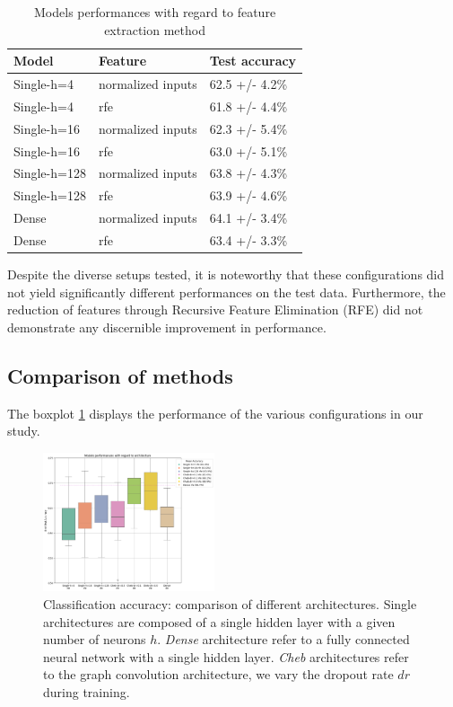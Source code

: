\begin{table}
	\begin{center}
		\begin{tabular}{lll}
			Model & Feature & Test accuracy \\
			\hline
			Single-h=4 & normalized inputs & 62.5 +/- 4.2\% \\
			Single-h=4 & rfe & 61.8 +/- 4.4\% \\
			Single-h=16 & normalized inputs & 62.3 +/- 5.4\% \\
			Single-h=16 & rfe & 63.0 +/- 5.1\% \\
			Single-h=128 & normalized inputs & 63.8 +/- 4.3\% \\
			Single-h=128 & rfe & 63.9 +/- 4.6\% \\
			Dense & normalized inputs & 64.1 +/- 3.4\% \\
			Dense & rfe & 63.4 +/- 3.3\% \\
		\end{tabular}
	\end{center}
	\caption{Models performances with regard to feature extraction method}
	\label{table:dependance_on_feature_extraction_method}
\end{table}

Despite the diverse setups tested, it is noteworthy that these configurations did not yield significantly different performances on the test data. Furthermore, the reduction of features through Recursive Feature Elimination (RFE) did not demonstrate any discernible improvement in performance.

\subsection{Comparison of methods}

The boxplot \ref{fig:results_architecture} displays the performance of the various configurations in our study. 
\begin{figure}[h!]
    \centering
    \includegraphics[width=0.45\textwidth]{figures/model_performances_architecture.png}
    \caption{Classification accuracy: comparison of different architectures.
    Single architectures are composed of a single hidden layer with a given number of neurons $h$.
    \textit{Dense} architecture refer to a fully connected neural network with a single hidden layer.
    \textit{Cheb} architectures refer to the graph convolution architecture, we vary the dropout rate $dr$
    during training.}
    \Description{}
    \label{fig:results_architecture}
\end{figure}

